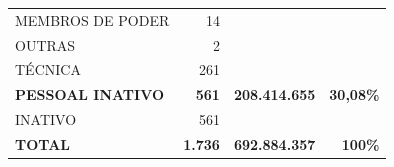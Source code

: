 \documentclass{article}
\begin{document}
\begin{longtable}[c]{m{7cm}|m{2.5cm}|m{2.5cm}|m{2.5cm}}
\multicolumn{1}{L{7cm}|}{ \hspace{3em} MEMBROS DE PODER} & \multicolumn{1}{r|}{ 14} &  & \\
\multicolumn{1}{L{7cm}|}{ \hspace{3em} OUTRAS} & \multicolumn{1}{r|}{ 2} &  & \\
\multicolumn{1}{L{7cm}|}{ \hspace{3em} TÉCNICA} & \multicolumn{1}{r|}{ 261} &  & \\
\multicolumn{1}{L{7cm}|}{ \textbf{PESSOAL INATIVO}} & \multicolumn{1}{r|}{ \textbf{  561}} & \multicolumn{1}{r|}{ \textbf{208.414.655}} & \multicolumn{1}{r}{ \textbf{30,08\%}} \\
\multicolumn{1}{L{7cm}|}{ \hspace{3em} INATIVO} & \multicolumn{1}{r|}{ 561} &  & \\
\hline \hline 
\multicolumn{1}{L{7cm}|}{ \textbf{TOTAL}} & \multicolumn{1}{r|}{ \textbf{1.736}} & \multicolumn{1}{r|}{ \textbf{692.884.357}} & \multicolumn{1}{r}{ \textbf{100\%}} \\
\end{longtable}
\newpage
\small
\end{document}
